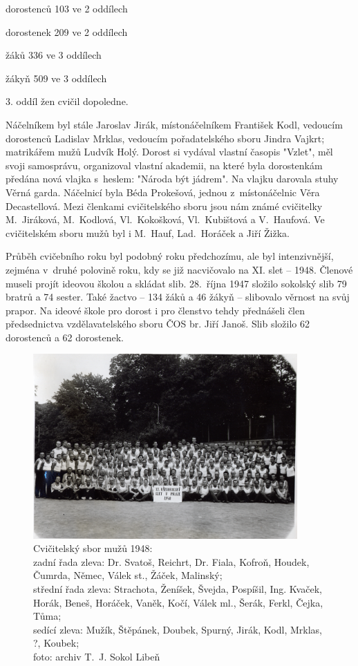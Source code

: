 \documentclass[a5paper, 11pt, twoside]{article}
\begin{document}
dorostenců 103 ve 2 oddílech

dorostenek 209 ve 2 oddílech

žáků 336 ve 3 oddílech

žákyň 509 ve 3 oddílech

3. oddíl žen cvičil dopoledne.
\medskip

{\sloppy Náčelníkem byl stále Jaroslav Jirák, místonáčelníkem František Kodl,
vedoucím dorostenců Ladislav Mrklas, vedoucím pořadatelského sboru
Jindra Vajkrt; matrikářem mužů Ludvík Holý. Dorost si vydával vlastní
časopis "Vzlet", měl svoji samosprávu, organizoval vlastní akademii, na
které byla dorostenkám předána nová vlajka s~heslem: "Národa být
jádrem". Na vlajku darovala stuhy Věrná garda. Náčelnicí byla Béda
Prokešová, jednou z~místonáčelnic Věra Decastellová. Mezi členkami
cvičitelského sboru jsou nám známé cvičitelky M.~Jiráková, M.~Kodlová,
Vl.~Kokošková, Vl.~Kubištová a V.~Haufová. Ve cvičitelském sboru mužů
byl i M.~Hauf, Lad.~Horáček a Jiří Žižka. \par}

Průběh cvičebního roku byl podobný roku předchozímu, ale byl
intenzivnější, zejména v~druhé polovině roku, kdy se již nacvičovalo na
XI. slet -- 1948. Členové museli projít ideovou školou a skládat slib.
28.~října 1947 složilo sokolský slib 79 bratrů a 74 sester. Také žactvo
-- 134 žáků a 46 žákyň -- slibovalo věrnost na svůj prapor. Na ideové
škole pro dorost i pro členstvo tehdy přednášeli člen předsednictva
vzdělavatelského sboru ČOS br. Jiří Janoš. Slib složilo 62 dorostenců a
62 dorostenek.

\begin{figure}[h!]
  \centering 
  \includegraphics[width=0.9\textwidth]{img/31_muzi_cvicitele.jpg}
  \caption*{Cvičitelský sbor mužů 1948:\\zadní řada zleva: Dr. Svatoš, Reichrt,
  Dr. Fiala, Kofroň, Houdek, Čumrda, Němec, Válek st., Žáček, Malinský;\\
  střední řada zleva: Strachota, Ženíšek, Švejda, Pospíšil, Ing. Kvaček,
  Horák, Beneš, Horáček, Vaněk, Kočí, Válek ml., Šerák, Ferkl, Čejka,
  Tůma;\\sedící zleva: Mužík, Štěpánek, Doubek, Spurný, Jirák, Kodl,
  Mrklas, ?, Koubek;\\foto: archiv T.~J. Sokol Libeň}
\end{figure}
\end{document}

